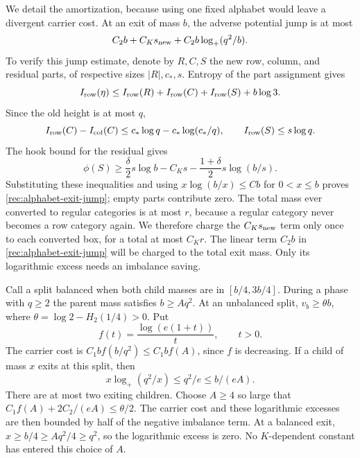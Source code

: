 We detail the amortization, because using one fixed alphabet would
leave a divergent carrier cost.  At an exit of mass $b$, the adverse
potential jump is at most
\begin{equation}\label{rec:alphabet-exit-jump}
 C_2b+C_Ks_{\rm new}+C_2b\log_+(q^2/b).
\end{equation}
To verify this jump estimate, denote by $R,C,S$ the new row, column,
and residual parts, of respective sizes $|R|,c_*,s$.  Entropy of the
part assignment gives
\[
 I_{\rm row}(\eta)\le I_{\rm row}(R)+I_{\rm row}(C)
                         +I_{\rm row}(S)+b\log3.
\]
Since the old height is at most $q$,
\[
 I_{\rm row}(C)-I_{\rm col}(C)
 \le c_*\log q-c_*\log(c_*/q),\qquad
 I_{\rm row}(S)\le s\log q.
\]
The hook bound for the residual gives
\[
 \phi(S)\ge\frac\delta2s\log b-C_Ks
                  -\frac{1+\delta}{2}s\log(b/s).
\]
Substituting these inequalities and using
$x\log(b/x)\le Cb$ for $0<x\le b$ proves
\eqref{rec:alphabet-exit-jump}; empty parts contribute zero.
The total mass ever converted to regular categories is at most $r$,
because a regular category never becomes a row category again.  We
therefore charge the $C_Ks_{\rm new}$ term only once to each converted
box, for a total at most $C_Kr$.  The linear term $C_2b$ in
\eqref{rec:alphabet-exit-jump} will be charged to the total exit mass.
Only its logarithmic excess needs an imbalance saving.

Call a split balanced when both child masses are in $[b/4,3b/4]$.
During a phase with $q\ge2$ the parent mass satisfies $b\ge Aq^2$.
At an unbalanced split,
$v_b\ge\theta b$, where $\theta=\log2-H_2(1/4)>0$.  Put
\[
 f(t)=\frac{\log(e(1+t))}{t},\qquad t>0.
\]
The carrier cost is $C_1bf(b/q^2)\le C_1bf(A)$, since $f$ is
decreasing.  If a child of mass $x$ exits at this split, then
\[
 x\log_+(q^2/x)\le q^2/e\le b/(eA).
\]
There are at most two exiting children.  Choose $A\ge4$ so large
that $C_1f(A)+2C_2/(eA)\le\theta/2$.  The carrier cost and these
logarithmic excesses are then bounded by half of the negative
imbalance term.  At a balanced exit, $x\ge b/4\ge Aq^2/4\ge q^2$,
so the logarithmic excess is zero.  No $K$-dependent constant has
entered this choice of $A$.

